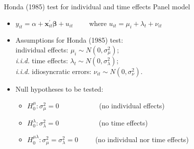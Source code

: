 \documentclass{beamer}
\begin{document}
\begin{frame}{Honda (1985) test for individual and time effects}
Panel model\\ \bigskip
\begin{itemize}
    \item $y_{it} = \alpha + \bm{x}^{\prime}_{it} \bm{\beta} + u_{it} \qquad$    where $u_{it}=\mu_i + \lambda_t + \nu_{it}$
    \medskip
    \item Assumptions for Honda (1985) test: \\  individual effects: $\mu_i \sim N(0,\sigma^2_{\mu})$; \\{\it i.i.d.} time effects: $\lambda_t \sim N(0,\sigma^2_{\lambda})$; \\{\it i.i.d.} idiosyncratic errors: $\nu_{it} \sim N(0,\sigma^2_{\nu})$.
    \medskip
    \item Null hypotheses to be tested:
    \smallskip
    \begin{itemize}
        \item $H_0^{\mu}: \sigma^2_{\mu} = 0 \qquad \qquad$ ~~~(no individual effects)
        \smallskip
        \item $H_0^{\lambda}: \sigma^2_{\lambda} = 0 \qquad \qquad$ ~~~(no time effects)
        \smallskip
        \item $H_0^{\mu \lambda}: \sigma^2_{\mu} = \sigma^2_{\lambda} = 0 \qquad \,$ (no individual nor time effects)
    \end{itemize}
\end{itemize}
\end{frame}
\end{document}
